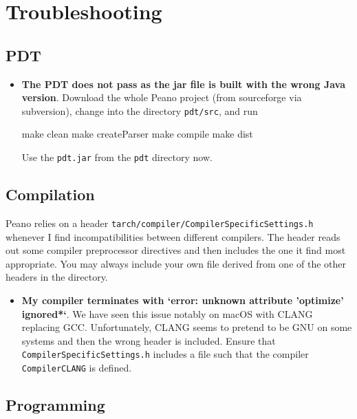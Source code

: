 \chapter{Troubleshooting}

\section{PDT}

\begin{itemize}
  \item {\bf The PDT does not pass as the jar file is built with the wrong Java
  version}. Download the whole Peano project (from sourceforge via subversion),
  change into the directory \texttt{pdt/src}, and run
  \begin{code}
  make clean
  make createParser
  make compile
  make dist
  \end{code}
  Use the \texttt{pdt.jar} from the \texttt{pdt} directory now. 
\end{itemize}





\section{Compilation}

Peano relies on a header \texttt{tarch/compiler/CompilerSpecificSettings.h}
whenever I find incompatibilities between different compilers. 
The header reads out some compiler preprocessor directives and then includes the
one it find most appropriate. 
You may always include your own file derived from one of the other headers in
the directory.


\begin{itemize}
  \item {\bf My compiler terminates with `error: unknown
   attribute 'optimize' ignored*`}. We have seen this issue notably on macOS
   with CLANG replacing GCC. Unfortunately, CLANG seems to pretend to be GNU on
   some systems and then the wrong header is included. Ensure that
   \texttt{CompilerSpecificSettings.h} includes a file such that the compiler
   \texttt{CompilerCLANG} is defined.
\end{itemize}




\section{Programming}

